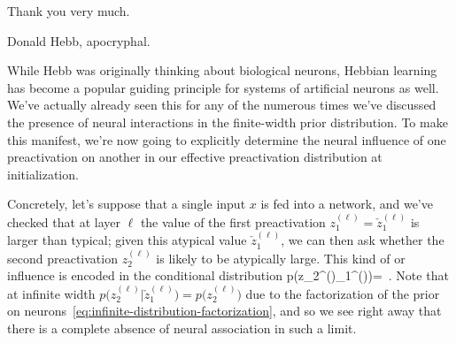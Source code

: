 \epigraph{Thank you very much.}{Donald Hebb, apocryphal.}

\noindent{}While Hebb was originally thinking about biological neurons, Hebbian learning has become a popular guiding principle for systems of artificial neurons as well. We've actually already seen this  for  any of the numerous times we've discussed the presence of neural interactions in the finite-width prior distribution. 
To make this manifest, we're now going to explicitly determine the neural influence of one preactivation on another in our effective preactivation distribution at initialization.

Concretely, let's suppose that a single input $x$ is fed into a network, and we've 
checked
that at layer $\ell$ the value of the first preactivation $z_1^{(\ell)}  = \check{z}_1^{(\ell)}$ is larger than typical; given this atypical value $\check{z}_1^{(\ell)}$, we can then ask whether the second preactivation $z_2^{(\ell)}$ is likely to be atypically large. This kind of  or influence is encoded in the conditional distribution
\be\label{eq:condition-from-one-to-two}
p\Big(z_2^{(\ell)}\Big\vert {}_1^{(\ell)}\Big)=\, .
\ee
Note that at infinite width $p\Big(z_2^{(\ell)}\Big\vert \check{z}_1^{(\ell)}\Big)=p\Big(z_2^{(\ell)}\Big)$ due to the factorization of the prior on neurons~\eqref{eq:infinite-distribution-factorization},
 and so we see right away that there is a complete absence of neural association in such a limit.



